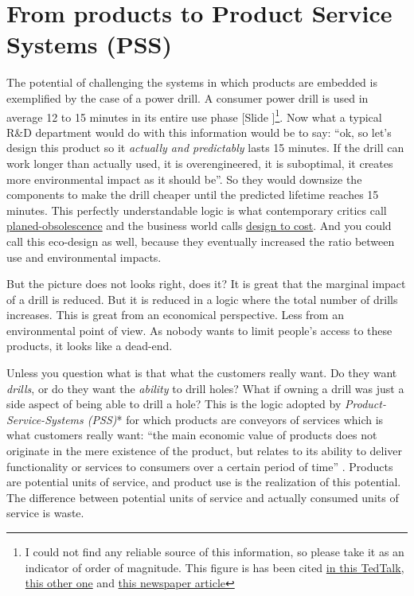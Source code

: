 \documentclass{article}
\newcounter{slide}
\begin{document}
\section{From products to Product Service Systems (PSS)}
\label{sec:pss}
The potential of challenging the systems in which products are embedded is exemplified by the case of a power drill. A consumer power drill is used in average 12 to 15 minutes in its entire use phase {\color{blue}[Slide ]}\footnote{I could not find any reliable source of this information, so please take it as an indicator of order of magnitude. This figure is has been cited \href{https://www.ted.com/talks/rachel_botsman_the_case_for_collaborative_consumption?language=en}{in this TedTalk}, \href{https://tedxinnovations.ted.com/2015/04/16/spotlight-tedx-talk-how-much-do-you-use-that-power-drill-why-were-sharing-tools-with-everyone-in-our-city/}{this other one} and \href{https://www.fastcompany.com/3050775/the-sharing-economy-is-dead-and-we-killed-it}{this newspaper article}}. Now what a typical R\&D department would do with this information would be to say: ``ok, so let's design this product so it \emph{actually and predictably} lasts 15 minutes. If the drill can work longer than actually used, it is overengineered, it is suboptimal, it creates more environmental impact as it should be''. So they would downsize the components to make the drill cheaper until the predicted lifetime reaches 15 minutes. This perfectly understandable logic is what contemporary critics call \href{https://en.wikipedia.org/wiki/Planned_obsolescence}{planed-obsolescence} and the business world calls \href{https://en.wikipedia.org/wiki/Design-to-cost}{design to cost}. And you could call this eco-design as well, because they eventually increased the ratio between use and environmental impacts.

But the picture does not looks right, does it? It is great that the marginal impact of a drill is reduced. But it is reduced in a logic where the total number of drills increases. This is great from an economical perspective. Less from an environmental point of view. As nobody wants to limit people's access to these products, it looks like a dead-end.

Unless you question what is that what the customers really want. Do they want \emph{drills}, or do they want the \emph{ability} to drill holes? What if owning a drill was just a side aspect of being able to drill a hole? This is the logic adopted by \emph{Product-Service-Systems (PSS)}* for which products are conveyors of services which is what customers really want: ``the main economic value of products does not originate in the mere existence of the product, but relates to its ability to deliver functionality or services to consumers over a certain period of time'' \cite{tukkerEightTypesProduct2004}. Products are potential units of service, and product use is the realization of this potential. The difference between potential units of service and actually consumed units of service is waste. 
\end{document}
